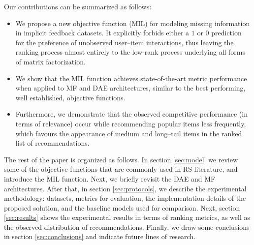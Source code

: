 Our contributions can be summarized as follows:
\begin{itemize}
\item We propose a new objective function (MIL) for modeling missing information in implicit feedback datasets. It explicitly forbids either a $1$ or $0$ prediction for the preference of unobserved user--item interactions, thus leaving the ranking process almost entirely to the low-rank process underlying all forms of matrix factorization. 
\item We show that the \textsc{MIL} function achieves state-of-the-art metric performance when applied to MF and DAE architectures, 
similar to the best performing, well established, objective functions. 
\item Furthermore, we demonstrate that the observed competitive performance (in terms of relevance) occur while recommending popular items less frequently, which favours the appearance of medium and long--tail items in the ranked list of recommendations.
\end{itemize}
	
The rest of the paper is organized as follows.
In section \ref{sec:model} we review some of the objective functions that are commonly used in RS literature, and introduce the MIL function. Next, we briefly revisit the DAE and MF architectures. 
After that, in section \ref{sec:protocols}, we describe the experimental methodology: datasets, metrics for evaluation, the implementation details of the proposed solution, and the baseline models used for comparison.
Next, section \ref{sec:results} shows the experimental results in terms of ranking metrics, as well as the observed distribution of recommendations.
Finally, we draw some conclusions in section \ref{sec:conclusions} and 
indicate future lines of research.
